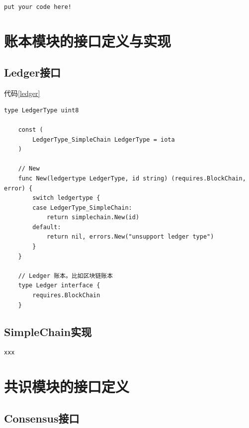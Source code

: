 \begin{lstlisting}[float,style=Go,caption=xxx]
	put your code here!
\end{lstlisting}

\section{账本模块的接口定义与实现}

\subsection{Ledger接口}

代码\ref{ledger}

\begin{lstlisting}[float,style=Go,caption=modules/ledger/ledger.go,label=ledger]
	type LedgerType uint8

	const (
		LedgerType_SimpleChain LedgerType = iota
	)

	// New
	func New(ledgertype LedgerType, id string) (requires.BlockChain, error) {
		switch ledgertype {
		case LedgerType_SimpleChain:
			return simplechain.New(id)
		default:
			return nil, errors.New("unsupport ledger type")
		}
	}

	// Ledger 账本。比如区块链账本
	type Ledger interface {
		requires.BlockChain
	}
\end{lstlisting}

\subsection{SimpleChain实现}

\begin{lstlisting}[float,style=Go,caption=modules/ledger/simplechain/simplechain.go]
xxx
\end{lstlisting}

\section{共识模块的接口定义}

\subsection{Consensus接口}

